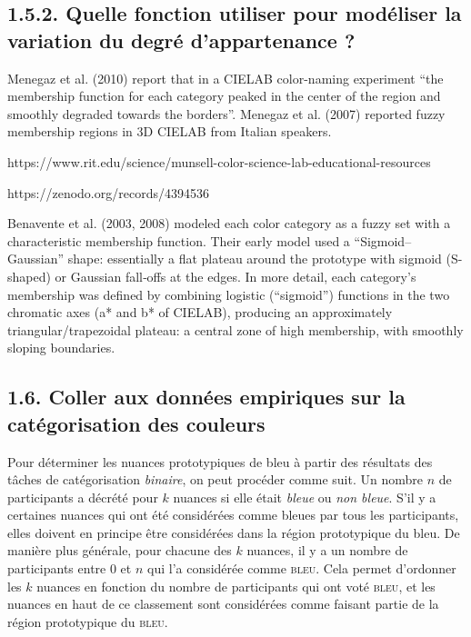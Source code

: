 \documentclass{article}
\begin{document}
\subsection*{1.5.2. Quelle fonction utiliser pour modéliser la variation du degré d'appartenance ?}


Menegaz et al. (2010) report that in a CIELAB color-naming experiment “the membership function for each category peaked in the center of the region and smoothly degraded towards the borders”. Menegaz et al. (2007) reported fuzzy membership regions in 3D CIELAB from Italian speakers.

https://www.rit.edu/science/munsell-color-science-lab-educational-resources

https://zenodo.org/records/4394536

Benavente et al. (2003, 2008) modeled each color category as a fuzzy set with a characteristic membership function. Their early model used a “Sigmoid–Gaussian” shape: essentially a flat plateau around the prototype with sigmoid (S-shaped) or Gaussian fall‐offs at the edges. In more detail, each category’s membership was defined by combining logistic (“sigmoid”) functions in the two chromatic axes (a* and b* of CIELAB), producing an approximately triangular/trapezoidal plateau: a central zone of high membership, with smoothly sloping boundaries.

\subsection*{1.6. Coller aux données empiriques sur la catégorisation des couleurs}

\par
Pour déterminer les nuances prototypiques de bleu à partir des résultats des tâches de  catégorisation \textit{binaire}, on peut procéder comme suit. Un nombre $n$ de participants a décrété  pour $k$ nuances si elle était \textit{bleue} ou \textit{non bleue}. S'il y a certaines nuances qui ont été considérées  comme bleues par tous les participants, elles doivent en principe être considérées dans la région prototypique du bleu. De manière plus générale, pour chacune des $k$ nuances, il y a un nombre  de participants entre 0 et $n$ qui l'a considérée comme \textsc{bleu}. Cela permet d'ordonner les $k$ nuances en fonction du nombre de participants qui ont voté \textsc{bleu}, et les nuances en haut de ce  classement sont considérées comme faisant partie de la région prototypique du \textsc{bleu}.
\end{document}
